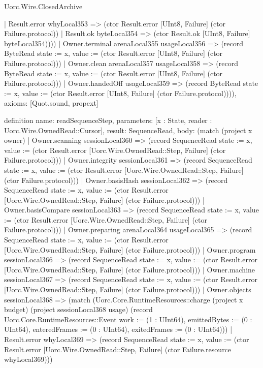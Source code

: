 \begin{lexlean}{Uorc.Wire.ClosedArchive}
\begin{semanticmodule}
{{        | Result.error whyLocal353 => (ctor Result.error [UInt8, Failure] (ctor Failure.protocol))
        | Result.ok byteLocal354 => (ctor Result.ok [UInt8, Failure] byteLocal354))}))
    | Owner.terminal arenaLocal355 usageLocal356 => (record ByteRead {state := x, value := (ctor Result.error [UInt8, Failure] (ctor Failure.protocol))})
    | Owner.clean arenaLocal357 usageLocal358 => (record ByteRead {state := x, value := (ctor Result.error [UInt8, Failure] (ctor Failure.protocol))})
    | Owner.handedOff usageLocal359 => (record ByteRead {state := x, value := (ctor Result.error [UInt8, Failure] (ctor Failure.protocol))})),
  axioms: [Quot.sound, propext]
}

definition{
  name: readSequenceStep,
  parameters: [x : State, reader : Uorc.Wire.OwnedRead::Cursor],
  result: SequenceRead,
  body: (match (project x owner)
    | Owner.scanning sessionLocal360 => (record SequenceRead {state := x, value := (ctor Result.error [Uorc.Wire.OwnedRead::Step, Failure] (ctor Failure.protocol))})
    | Owner.integrity sessionLocal361 => (record SequenceRead {state := x, value := (ctor Result.error [Uorc.Wire.OwnedRead::Step, Failure] (ctor Failure.protocol))})
    | Owner.basisHash sessionLocal362 => (record SequenceRead {state := x, value := (ctor Result.error [Uorc.Wire.OwnedRead::Step, Failure] (ctor Failure.protocol))})
    | Owner.basisCompare sessionLocal363 => (record SequenceRead {state := x, value := (ctor Result.error [Uorc.Wire.OwnedRead::Step, Failure] (ctor Failure.protocol))})
    | Owner.preparing arenaLocal364 usageLocal365 => (record SequenceRead {state := x, value := (ctor Result.error [Uorc.Wire.OwnedRead::Step, Failure] (ctor Failure.protocol))})
    | Owner.program sessionLocal366 => (record SequenceRead {state := x, value := (ctor Result.error [Uorc.Wire.OwnedRead::Step, Failure] (ctor Failure.protocol))})
    | Owner.machine sessionLocal367 => (record SequenceRead {state := x, value := (ctor Result.error [Uorc.Wire.OwnedRead::Step, Failure] (ctor Failure.protocol))})
    | Owner.objects sessionLocal368 => (match (Uorc.Core.RuntimeResources::charge (project x budget) (project sessionLocal368 usage) (record Uorc.Core.RuntimeResources::Event {work := (1 : UInt64), emittedBytes := (0 : UInt64), enteredFrames := (0 : UInt64), exitedFrames := (0 : UInt64)}))
      | Result.error whyLocal369 => (record SequenceRead {state := x, value := (ctor Result.error [Uorc.Wire.OwnedRead::Step, Failure] (ctor Failure.resource whyLocal369))})
}
\end{semanticmodule}
\end{lexlean}
